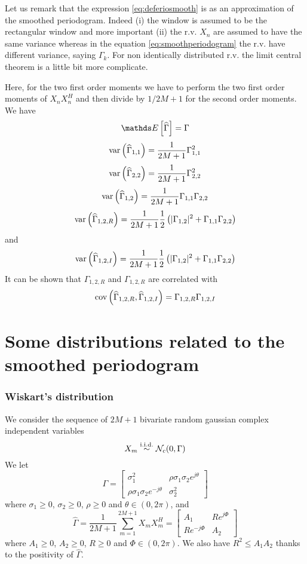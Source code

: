 \begin{remark}
Let us remark that the expression \eqref{eq:deferiosmooth} is as an approximation of the smoothed periodogram. Indeed (i) the window is assumed to be the rectangular window and more important (ii) the r.v. $X_{n}$ are assumed to have the same variance whereas in the equation \eqref{eq:smoothperiodogram} the r.v. have different variance, saying $\Gamma_{k}$. For non identically distributed r.v. the limit central theorem is a little bit more complicate.
\end{remark}
Here, for the two first order moments we have to perform the two first order moments of $X_{n}X_{n}^{H}$ and then divide by $1/2M+1$ for the second order moments. We have
$$
 \esp{\hat \Gamma}=\Gamma
$$
$$
 \mathrm{var}\left( \widehat\Gamma_{1,1} \right)=\frac{1}{2M+1}\Gamma_{1,1}^{2}
$$
$$
 \mathrm{var}\left( \widehat\Gamma_{2,2} \right)=\frac{1}{2M+1}\Gamma_{2,2}^{2}
$$
$$
 \mathrm{var}\left( \widehat\Gamma_{1,2} \right)=\frac{1}{2M+1}\Gamma_{1,1}\Gamma_{2,2}
$$
$$
 \mathrm{var}\left( \widehat\Gamma_{1,2,R} \right)=\frac{1}{2M+1}\frac{1}{2}
  \left( |\Gamma_{1,2}|^{2}+\Gamma_{1,1}\Gamma_{2,2}
  \right)
$$
and
$$
 \mathrm{var}\left( \widehat\Gamma_{1,2,I} \right)=\frac{1}{2M+1}\frac{1}{2}
  \left( |\Gamma_{1,2}|^{2}+\Gamma_{1,1}\Gamma_{2,2}
  \right)
$$
It can be shown that $\Gamma_{1,2,R}$ and $\Gamma_{1,2,R}$ are correlated with
$$
 \mathrm{cov}\left( \widehat\Gamma_{1,2,R},\widehat\Gamma_{1,2,I} \right)=\Gamma_{1,2,R}\Gamma_{1,2,I}
$$



\section{Some distributions related to the smoothed periodogram}
\subsubsection{Wiskart's distribution}

We consider the sequence of $2M+1$ bivariate random gaussian complex independent variables
$$
 X_{m}\stackrel{\mathrm{i.i.d.}}{\sim}\mathcal{N}_{c}(0,\Gamma)
$$
We let
$$
 \Gamma =
 \begin{bmatrix}
 \sigma_{1}^{2}&\rho \sigma_{1}\sigma_{2}e^{j\theta}
 \\
 \rho \sigma_{1}\sigma_{2}e^{-j\theta}&\sigma_{2}^{2}
 \end{bmatrix}
$$
where $\sigma_{1}\geq 0$, $\sigma_{2}\geq 0$, $\rho\geq 0$ and $\theta\in(0,2\pi)$, 
and
$$
 \hat\Gamma=\frac{1}{2M+1}\sum_{m=1}^{2M+1}X_{m}X_{m}^{H}=\begin{bmatrix}
 A_{1}%
 &
 R e^{j\Phi}%
 \\
 R e^{-j\Phi}%
 &
 A_{2}%
 \end{bmatrix}
$$
where $A_{1}\geq 0$, $A_{2}\geq 0$, $R\geq 0$ and $\Phi\in(0,2\pi)$. We also have $R^{2}\leq A_{1}A_{2}$ thanks to the positivity of $\hat\Gamma$.


